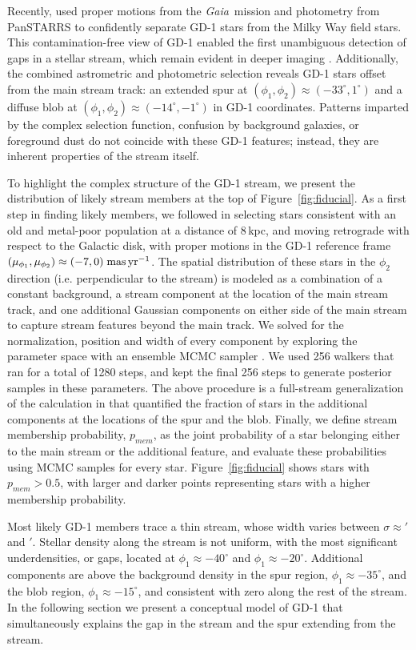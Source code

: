 \documentclass[12pt, modern]{aastex62}
\newcommand{\gaia}{\textsl{Gaia}}
\begin{document}
Recently, \citet{pwb} used proper motions from the \gaia\ mission \citep{gdr2} and photometry from PanSTARRS \citep{ps} to confidently separate GD-1 stars from the Milky Way field stars.
This contamination-free view of GD-1 enabled the first unambiguous detection of gaps in a stellar stream, which remain evident in deeper imaging \citep{deboer2018}.
Additionally, the combined astrometric and photometric selection reveals GD-1 stars offset from the main stream track: an extended spur at $(\phi_1, \phi_2)\approx(-33^\circ,1^\circ)$ and a diffuse blob at $(\phi_1, \phi_2)\approx(-14^\circ,-1^\circ)$ in GD-1 coordinates.
Patterns imparted by the complex selection function, confusion by background galaxies, or foreground dust do not coincide with these GD-1 features; instead, they are inherent properties of the stream itself.

To highlight the complex structure of the GD-1 stream, we present the distribution of likely stream members at the top of Figure~\ref{fig:fiducial}.
As a first step in finding likely members, we followed \citet{pwb} in selecting stars consistent with an old and metal-poor population at a distance of 8\,kpc, and moving retrograde with respect to the Galactic disk, with proper motions in the GD-1 reference frame $(\mu_{\phi_1}, \mu_{\phi_2})\approx(-7,0)\;\rm mas\,yr^{-1}$.
The spatial distribution of these stars in the $\phi_2$ direction (i.e. perpendicular to the stream) is modeled as a combination of a constant background, a stream component at the location of the main stream track, and one additional Gaussian components on either side of the main stream to capture stream features beyond the main track.
We solved for the normalization, position and width of every component by exploring the parameter space with an ensemble MCMC sampler \citep{Foreman-Mackey:2013}.
We used 256 walkers that ran for a total of 1280 steps, and kept the final 256 steps to generate posterior samples in these parameters.
The above procedure is a full-stream generalization of the calculation in \citep{pwb} that quantified the fraction of stars in the additional components at the locations of the spur and the blob.
Finally, we define stream membership probability, $p_{mem}$, as the joint probability of a star belonging either to the main stream or the additional feature, and evaluate these probabilities using MCMC samples for every star.
Figure~\ref{fig:fiducial} shows stars with $p_{mem}>0.5$, with larger and darker points representing stars with a higher membership probability.

Most likely GD-1 members trace a thin stream, whose width varies between $\sigma\approx'$ and $'$.
Stellar density along the stream is not uniform, with the most significant underdensities, or gaps, located at $\phi_1\approx-40^\circ$ and $\phi_1\approx-20^\circ$.
Additional components are above the background density in the spur region, $\phi_1\approx-35^\circ$, and the blob region, $\phi_1\approx-15^\circ$, and consistent with zero along the rest of the stream.
In the following section we present a conceptual model of GD-1 that simultaneously explains the gap in the stream and the spur extending from the stream.
\end{document}
